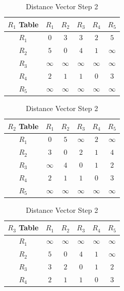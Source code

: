 \documentclass[en]{university}
\begin{document}
\begin{minipage}[t]{0.5\textwidth}
    \begin{table}[H]
        \centering
        \caption{Distance Vector Step 2}
        \label{tab:dvr2}
        \begin{tabular}{c|*5c}
            $R_1$ Table & $R_1$    & $R_2$    & $R_3$    & $R_4$    & $R_5$    \\
            \hline
            $R_1$       & $0$      & $3$      & $3$      & $2$      & $5$      \\
            $R_2$       & $5$      & $0$      & $4$      & $1$      & $\infty$ \\
            $R_3$       & $\infty$ & $\infty$ & $\infty$ & $\infty$ & $\infty$ \\
            $R_4$       & $2$      & $1$      & $1$      & $0$      & $3$      \\
            $R_5$       & $\infty$ & $\infty$ & $\infty$ & $\infty$ & $\infty$
        \end{tabular}
        \begin{tabular}{c|*5c}
            $R_2$ Table & $R_1$    & $R_2$    & $R_3$    & $R_4$    & $R_5$    \\
            \hline
            $R_1$       & $0$      & $5$      & $\infty$ & $2$      & $\infty$ \\
            $R_2$       & $3$      & $0$      & $2$      & $1$      & $4$      \\
            $R_3$       & $\infty$ & $4$      & $0$      & $1$      & $2$      \\
            $R_4$       & $2$      & $1$      & $1$      & $0$      & $3$      \\
            $R_5$       & $\infty$ & $\infty$ & $\infty$ & $\infty$ & $\infty$
        \end{tabular}
        \begin{tabular}{c|*5c}
            $R_3$ Table & $R_1$    & $R_2$    & $R_3$    & $R_4$    & $R_5$    \\
            \hline
            $R_1$       & $\infty$ & $\infty$ & $\infty$ & $\infty$ & $\infty$ \\
            $R_2$       & $5$      & $0$      & $4$      & $1$      & $\infty$ \\
            $R_3$       & $3$      & $2$      & $0$      & $1$      & $2$      \\
            $R_4$       & $2$      & $1$      & $1$      & $0$      & $3$      \\

\end{tabular}
\end{table}
\end{minipage}
\end{document}

